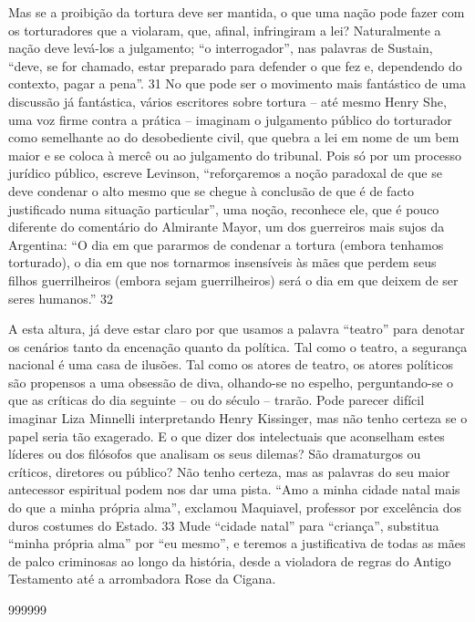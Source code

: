  
\par
 
Mas se a proibição da tortura deve ser mantida, o que uma nação pode fazer com os torturadores que a violaram, que, afinal, infringiram a lei? Naturalmente a nação deve levá-los a julgamento; “o interrogador”, nas palavras de Sustain, “deve, se for chamado, estar preparado para defender o que fez e, dependendo do contexto, pagar a pena”.
 {\color{blue} 31}  
No que pode ser o movimento mais fantástico de uma discussão já fantástica, vários escritores sobre tortura – até mesmo Henry She, uma voz firme contra a prática – imaginam o julgamento público do torturador como semelhante ao do desobediente civil, que quebra a lei em nome de um bem maior e se coloca à mercê ou ao julgamento do tribunal. Pois só por um processo jurídico público, escreve Levinson, “reforçaremos a noção paradoxal de que se deve condenar o alto mesmo que se chegue à conclusão de que é de facto justificado numa situação particular”, uma noção, reconhece ele, que é pouco diferente do comentário do Almirante Mayor, um dos guerreiros mais sujos da Argentina: “O dia em que pararmos de condenar a tortura (embora tenhamos torturado), o dia em que nos tornarmos insensíveis às mães que perdem seus filhos guerrilheiros (embora sejam guerrilheiros) será o dia em que deixem de ser seres humanos.”
 {\color{blue} 32}  

 
\par
 
A esta altura, já deve estar claro por que usamos a palavra “teatro” para denotar os cenários tanto da encenação quanto da política. Tal como o teatro, a segurança nacional é uma casa de ilusões. Tal como os atores de teatro, os atores políticos são propensos a uma obsessão de diva, olhando-se no espelho, perguntando-se o que as críticas do dia seguinte – ou do século – trarão. Pode parecer difícil imaginar Liza Minnelli interpretando Henry Kissinger, mas não tenho certeza se o papel seria tão exagerado. E o que dizer dos intelectuais que aconselham estes líderes ou dos filósofos que analisam os seus dilemas? São dramaturgos ou críticos, diretores ou público? Não tenho certeza, mas as palavras do seu maior antecessor espiritual podem nos dar uma pista. “Amo a minha cidade natal mais do que a minha própria alma”, exclamou Maquiavel, professor por excelência dos duros costumes do Estado.
 {\color{blue} 33}  
Mude “cidade natal” para “criança”, substitua “minha própria alma” por “eu mesmo”, e teremos a justificativa de todas as mães de palco criminosas ao longo da história, desde a violadora de regras do Antigo Testamento até a arrombadora Rose da Cigana.
 
\par
  
 
999999
